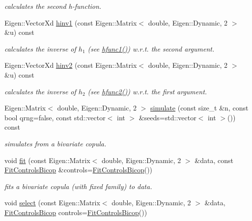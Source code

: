 \begin{DoxyCompactItemize}
\begin{DoxyCompactList}\small\item\em calculates the second h-\/function. \end{DoxyCompactList}\item 
Eigen\+::\+Vector\+Xd \hyperlink{classvinecopulib_1_1_bicop_aa4c7814cd1728ecf4c965aed5499968f}{hinv1} (const Eigen\+::\+Matrix$<$ double, Eigen\+::\+Dynamic, 2 $>$ \&u) const
\begin{DoxyCompactList}\small\item\em calculates the inverse of $ h_1 $ (see \hyperlink{classvinecopulib_1_1_bicop_ae6d42fab3bc19b807f41ccecfc80de46}{hfunc1()}) w.\+r.\+t. the second argument. \end{DoxyCompactList}\item 
Eigen\+::\+Vector\+Xd \hyperlink{classvinecopulib_1_1_bicop_a571c4e213695f805f8e0e7843f9b245b}{hinv2} (const Eigen\+::\+Matrix$<$ double, Eigen\+::\+Dynamic, 2 $>$ \&u) const
\begin{DoxyCompactList}\small\item\em calculates the inverse of $ h_2 $ (see \hyperlink{classvinecopulib_1_1_bicop_a9bbf2e9ab9a04a45e8d98206a46b7596}{hfunc2()}) w.\+r.\+t. the first argument. \end{DoxyCompactList}\item 
Eigen\+::\+Matrix$<$ double, Eigen\+::\+Dynamic, 2 $>$ \hyperlink{classvinecopulib_1_1_bicop_a31dc185fdd1be89370088eea3fad23e6}{simulate} (const size\+\_\+t \&n, const bool qrng=false, const std\+::vector$<$ int $>$ \&seeds=std\+::vector$<$ int $>$()) const
\begin{DoxyCompactList}\small\item\em simulates from a bivariate copula. \end{DoxyCompactList}\item 
void \hyperlink{classvinecopulib_1_1_bicop_ac95738f7f2ec4e008404f5621030efc1}{fit} (const Eigen\+::\+Matrix$<$ double, Eigen\+::\+Dynamic, 2 $>$ \&data, const \hyperlink{classvinecopulib_1_1_fit_controls_bicop}{Fit\+Controls\+Bicop} \&controls=\hyperlink{classvinecopulib_1_1_fit_controls_bicop}{Fit\+Controls\+Bicop}())
\begin{DoxyCompactList}\small\item\em fits a bivariate copula (with fixed family) to data. \end{DoxyCompactList}\item 
void \hyperlink{classvinecopulib_1_1_bicop_a40e37a67480de2990821580eb09ba354}{select} (const Eigen\+::\+Matrix$<$ double, Eigen\+::\+Dynamic, 2 $>$ \&data, \hyperlink{classvinecopulib_1_1_fit_controls_bicop}{Fit\+Controls\+Bicop} controls=\hyperlink{classvinecopulib_1_1_fit_controls_bicop}{Fit\+Controls\+Bicop}())

\end{DoxyCompactItemize}
